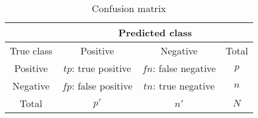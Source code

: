 \begin{table}[ht]
    \centering
    \begin{tabular}{|c|c|c|c|}\hline
                &   \multicolumn{3}{c|}{Predicted class}\\\hline
    True class  &  Positive             & Negative              & Total \\\hline
    Positive    & $tp$: true positive   & $fn$: false negative  & $p$   \\
    Negative    & $fp$: false positive  & $tn$: true negative   & $n$   \\\hline
    Total       & $p'$                  & $n'$                  & $N$   \\\hline
    \end{tabular}
    \caption{Confusion matrix}
    \label{tab:confmat}
\end{table}